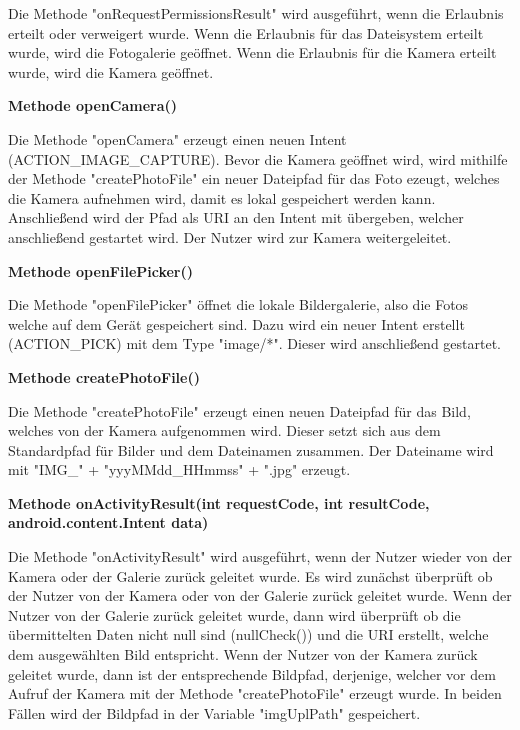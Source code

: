 \documentclass{scrartcl}
\begin{document}
\noindent Die Methode "onRequestPermissionsResult" wird ausgeführt, wenn die Erlaubnis erteilt oder verweigert wurde. Wenn die Erlaubnis für das Dateisystem erteilt wurde, wird die Fotogalerie geöffnet. Wenn die Erlaubnis für die Kamera erteilt wurde, wird die Kamera geöffnet. \newline 

\noindent\textbf{Methode openCamera()} 

\noindent Die Methode "openCamera" erzeugt einen neuen Intent (ACTION\_IMAGE\_CAPTURE). Bevor die Kamera geöffnet wird, wird mithilfe der Methode "createPhotoFile" ein neuer Dateipfad für das Foto ezeugt, welches die Kamera aufnehmen wird, damit es lokal gespeichert werden kann. Anschließend wird der Pfad als URI an den Intent mit übergeben, welcher anschließend gestartet wird. Der Nutzer wird zur Kamera weitergeleitet. \newline

\noindent\textbf{Methode openFilePicker()} 

\noindent Die Methode "openFilePicker" öffnet die lokale Bildergalerie, also die Fotos welche auf dem Gerät gespeichert sind. Dazu wird ein neuer Intent erstellt (ACTION\_PICK) mit dem Type "image/*". Dieser wird anschließend gestartet. \newline

\noindent\textbf{Methode createPhotoFile()} 

\noindent Die Methode "createPhotoFile" erzeugt einen neuen Dateipfad für das Bild, welches von der Kamera aufgenommen wird. Dieser setzt sich aus dem Standardpfad für Bilder und dem Dateinamen zusammen. Der Dateiname wird mit "IMG\_" + "yyyMMdd\_HHmmss" + ".jpg" erzeugt. \newline

\noindent\textbf{Methode onActivityResult(int requestCode, int resultCode, \newline android.content.Intent data)} 

\noindent Die Methode "onActivityResult" wird ausgeführt, wenn der Nutzer wieder von der Kamera oder der Galerie zurück geleitet wurde. Es wird zunächst überprüft ob der Nutzer von der Kamera oder von der Galerie zurück geleitet wurde. Wenn der Nutzer von der Galerie zurück geleitet wurde, dann wird überprüft ob die übermittelten Daten nicht null sind (nullCheck()) und die URI erstellt, welche dem ausgewählten Bild entspricht. Wenn der Nutzer von der Kamera zurück geleitet wurde, dann ist der entsprechende Bildpfad, derjenige, welcher vor dem Aufruf der Kamera mit der Methode "createPhotoFile" erzeugt wurde. In beiden Fällen wird der Bildpfad in der Variable "imgUplPath" gespeichert. \newline
\end{document}
